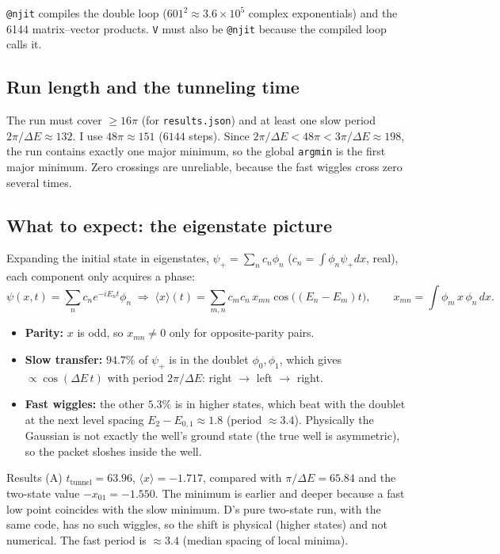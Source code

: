 \documentclass[10pt]{article}
\newcommand{\code}[1]{\texttt{#1}}
\begin{document}
\code{@njit} compiles the double loop ($601^2\approx3.6\times10^5$ complex exponentials) and the 6144 matrix--vector products. \code{V} must also be \code{@njit} because the compiled loop calls it.

\subsection{Run length and the tunneling time}
The run must cover $\ge16\pi$ (for \code{results.json}) and at least one slow period $2\pi/\Delta E\approx132$. I use $48\pi\approx151$ ($6144$ steps). Since $2\pi/\Delta E<48\pi<3\pi/\Delta E\approx198$, the run contains exactly one major minimum, so the global \code{argmin} is the first major minimum. Zero crossings are unreliable, because the fast wiggles cross zero several times.

\subsection{What to expect: the eigenstate picture}
Expanding the initial state in eigenstates, $\psi_+=\sum_nc_n\phi_n$ ($c_n=\int\phi_n\psi_+dx$, real), each component only acquires a phase:
\[
\psi(x,t)=\sum_nc_ne^{-iE_nt}\phi_n\;\Rightarrow\;
\langle x\rangle(t)=\sum_{m,n}c_mc_n\,x_{mn}\cos\big((E_n-E_m)t\big),\qquad x_{mn}=\int\phi_m\,x\,\phi_n\,dx .
\]
\begin{itemize}
\item \textbf{Parity:} $x$ is odd, so $x_{mn}\ne0$ only for opposite-parity pairs.
\item \textbf{Slow transfer:} $94.7\%$ of $\psi_+$ is in the doublet $\phi_0,\phi_1$, which gives $\propto\cos(\Delta E\,t)$ with period $2\pi/\Delta E$: right $\to$ left $\to$ right.
\item \textbf{Fast wiggles:} the other $5.3\%$ is in higher states, which beat with the doublet at the next level spacing $E_2-E_{0,1}\approx1.8$ (period $\approx3.4$). Physically the Gaussian is not exactly the well's ground state (the true well is asymmetric), so the packet sloshes inside the well.
\end{itemize}
\begin{resbox}{Results (A)}
$t_\text{tunnel}=63.96$, $\langle x\rangle=-1.717$, compared with $\pi/\Delta E=65.84$ and the two-state value $-x_{01}=-1.550$. The minimum is earlier and deeper because a fast low point coincides with the slow minimum. D's pure two-state run, with the same code, has no such wiggles, so the shift is physical (higher states) and not numerical. The fast period is $\approx3.4$ (median spacing of local minima).
\end{resbox}
\end{document}
